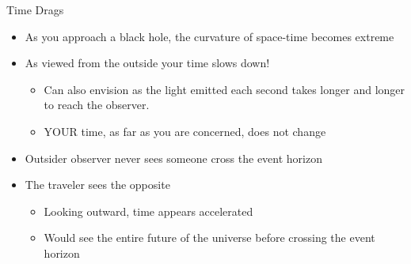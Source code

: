 \documentclass[pdf, aspectratio=169]{beamer}
\begin{document}
\begin{frame}{Time Drags}
  \begin{itemize}
	\item As you approach a black hole, the curvature of space-time becomes extreme
	\item \alert{As viewed from the outside} your time slows down!
	  \begin{itemize}
		\item Can also envision as the light emitted each second takes longer and longer to reach the observer.
		\item YOUR time, as far as you are concerned, does not change
	  \end{itemize}
	\item Outsider observer never sees someone cross the event horizon
	\item The traveler sees the opposite
	  \begin{itemize}
		\item Looking outward, time appears accelerated
		\item Would see the entire future of the universe before crossing the event horizon
	  \end{itemize}
  \end{itemize}
\end{frame}


\end{document}
